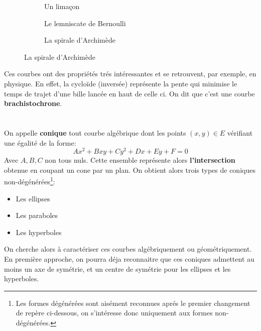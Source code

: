 \begin{figure}[h]
\begin{subfigure}{.3\textwidth}
      \caption*{Un limaçon}
   \end{subfigure}\quad
   \begin{subfigure}{.3\textwidth}
      \centering
      \caption*{Le lemniscate de Bernoulli}
   \end{subfigure}\quad
   \begin{subfigure}{.3\textwidth}
      \centering
      \caption*{La spirale d'Archimède}
   \end{subfigure}\quad
\end{figure}

Ces courbes ont des propriétés trés intéressantes et se retrouvent, par exemple, en physique. En effet, la cycloïde (inversée) représente la pente qui minimise le temps de trajet d'une bille lancée en haut de celle ci. On dit que c'est une courbe \textbf{brachistochrone}.
\subsection*{}

\chapter*{} %
On appelle \textbf{conique} tout courbe algébrique dont les points \((x, y) \in E\) vérifiant une égalité de la forme:
\[
   Ax^2 + Bxy + Cy^2 + Dx + Ey + F = 0  
\]
Avec \(A, B, C\) non tous nuls. Cette ensemble représente alors \textbf{l'intersection} obtenue en coupant un cone par un plan. On obtient alors trois types de coniques non-dégénérées\footnote[1]{Les formes dégénérées sont aisément reconnues aprés le premier changement de repère ci-dessous, on s'intéresse donc uniquement aux formes non-dégénérées.}:
\begin{itemize}
   \item Les ellipses
   \item Les paraboles
   \item Les hyperboles
\end{itemize}
On cherche alors à caractériser ces courbes algébriquement ou géométriquement. En première approche, on pourra déja reconnaitre que ces coniques admettent au moins un axe de symétrie, et un centre de symétrie pour les ellipses et les hyperboles.

